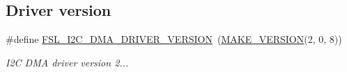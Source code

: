 \subsection*{Driver version}
\begin{DoxyCompactItemize}
\item 
\mbox{\label{group__i2c__dma__driver_ga2abc151af9c3437ca8da73905887d962}} 
\#define \mbox{\hyperlink{group__i2c__dma__driver_ga2abc151af9c3437ca8da73905887d962}{F\+S\+L\+\_\+\+I2\+C\+\_\+\+D\+M\+A\+\_\+\+D\+R\+I\+V\+E\+R\+\_\+\+V\+E\+R\+S\+I\+ON}}~(\mbox{\hyperlink{group__ftfx__utilities_ga812138aa3315b0c6953c1a26130bcc37}{M\+A\+K\+E\+\_\+\+V\+E\+R\+S\+I\+ON}}(2, 0, 8))
\begin{DoxyCompactList}\small\item\em I2C D\+MA driver version 2... \end{DoxyCompactList}\end{DoxyCompactItemize}
